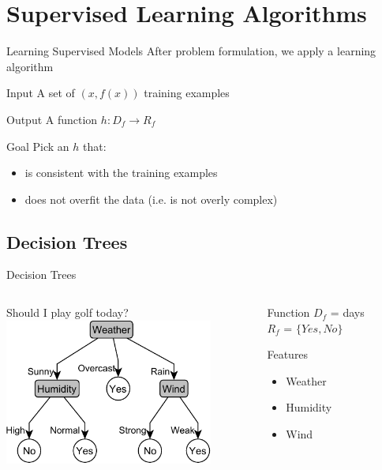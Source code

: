 \documentclass[14pt]{beamer}
\begin{document}
\section{Supervised Learning Algorithms}

\begin{frame}{Learning Supervised Models}
After problem formulation, we apply a \alert{learning algorithm} \\
\medskip
\begin{block}{Input}
A set of $(x, f(x))$ training examples
\end{block}
\pause
\begin{block}{Output}
A function $h\!: D_f \rightarrow R_f$
\end{block}
\pause
\begin{block}{Goal}
Pick an $h$ that:
\begin{itemize}
\item is consistent with the training examples
\item does not overfit the data (i.e. is not overly complex)
\end{itemize}
\end{block}
\end{frame}


\subsection{Decision Trees}

\begin{frame}{Decision Trees}
\begin{columns}
\begin{column}{2.7in}
\centering
Should I play golf today? \\
\bigskip
\includegraphics[width=2.7in]{play_golf}
\end{column}
\begin{column}{1.5in}
\begin{block}{Function}
$D_f$ = days \\
$R_f$ = $\{\textit{Yes}, \textit{No}\}$
\end{block}
\bigskip
\begin{block}{Features}
\begin{itemize}
\item Weather
\item Humidity
\item Wind
\end{itemize}
\end{block}
\end{column}
\end{columns}
\end{frame}
\end{document}
